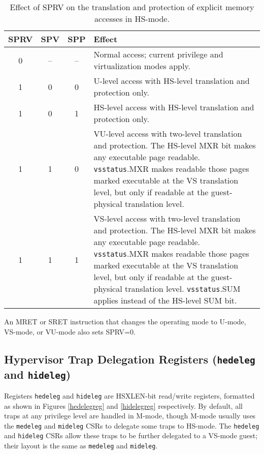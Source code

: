 \begin{table*}[h!]
\begin{center}
\begin{tabular}{|c|c|c||p{4.7in}|}
  \hline
   SPRV & SPV & SPP & Effect \\ \hline \hline
   0    & --  & --  & Normal access; current privilege and virtualization modes apply. \\ \hline
   1    & 0   & 0   & U-level access with HS-level translation and protection only. \\ \hline
   1    & 0   & 1   & HS-level access with HS-level translation and protection only. \\ \hline
   1    & 1   & 0   & VU-level access with two-level translation and protection. The HS-level MXR bit makes any executable page readable.  {\tt vsstatus}.MXR makes readable those pages marked executable at the VS translation level, but only if readable at the guest-physical translation level. \\ \hline
   1    & 1   & 1   & VS-level access with two-level translation and protection. The HS-level MXR bit makes any executable page readable.  {\tt vsstatus}.MXR makes readable those pages marked executable at the VS translation level, but only if readable at the guest-physical translation level.  {\tt vsstatus}.SUM applies instead of the HS-level SUM bit. \\ \hline
 \end{tabular}
\end{center}
\caption{Effect of SPRV on the translation and protection of explicit
memory accesses in HS-mode.}
\label{h-sprv}
\end{table*}

An MRET or SRET instruction that changes the operating mode to U-mode,
VS-mode, or VU-mode also sets SPRV=0.

\subsection{Hypervisor Trap Delegation Registers ({\tt hedeleg} and {\tt hideleg})}

Registers {\tt hedeleg} and {\tt hideleg} are HSXLEN-bit read/write
registers, formatted as shown in Figures \ref{hedelegreg} and
\ref{hidelegreg} respectively.
By default, all traps at any privilege level are handled in M-mode, though
M-mode usually uses the {\tt medeleg} and {\tt mideleg} CSRs to delegate
some traps to HS-mode.  The {\tt hedeleg} and {\tt hideleg} CSRs allow these
traps to be further delegated to a VS-mode guest; their layout is the same
as {\tt medeleg} and {\tt mideleg}.

